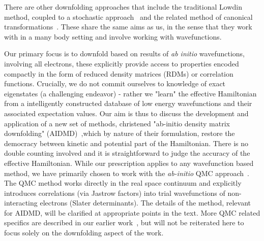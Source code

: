 There are other downfolding approaches that include the traditional Lowdin method, coupled to a stochastic 
approach~\cite{Tenno,Zhou_Ceperley} and the related method of canonical transformations~\cite{White_CT, Yanai_CT}. 
These share the same aims as us, in the sense that they work with 
in a many body setting and involve working with wavefunctions. 

Our primary focus is to downfold based on results of \textit{ab initio} wavefunctions, involving all electrons, 
these explicitly provide access to properties encoded compactly in the form of reduced 
density matrices (RDMs) or correlation functions. Crucially, we do not commit ourselves to 
knowledge of exact eigenstates (a challenging endeavor) - rather we "learn" the effective Hamiltonian from a 
intelligently constructed database of low energy wavefunctions and their associated expectation values. 
Our aim is thus to discuss the development and application of a new set of methods, christened 
"ab-initio density matrix downfolding" (AIDMD)~\cite{Changlani2015},which by nature of their formulation, 
restore the democracy between kinetic and potential part of the Hamiltonian. There is no double counting involved and it is straightforward 
to judge the accuracy of the effective Hamiltonian. While our prescription applies to any wavefunction based method, 
we have primarily chosen to work with the \textit{ab-initio} QMC approach~\cite{Ceperley_Alder,Foulkes_review}. 
The QMC method works directly in the real space continuum and explicitly introduces correlations (via Jastrow factors) 
into trial wavefunctions of non-interacting electrons (Slater determinants). 
The details of the method, relevant for AIDMD, will be clarified at appropriate points 
in the text. More QMC related specifics are described in our earlier work~\cite{Changlani2015,}, but will not be 
reiterated here to focus solely on the downfolding aspect of the work. 

